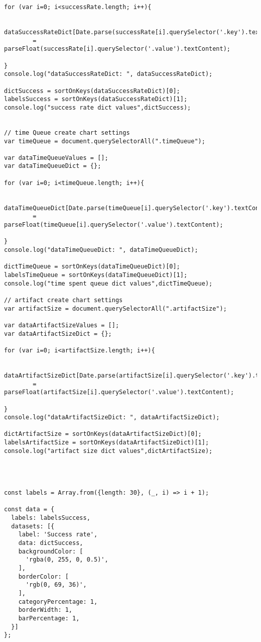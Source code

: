 \begin{lstlisting}
for (var i=0; i<successRate.length; i++){

    dataSuccessRateDict[Date.parse(successRate[i].querySelector('.key').textContent)]
        = parseFloat(successRate[i].querySelector('.value').textContent);

}
console.log("dataSuccessRateDict: ", dataSuccessRateDict);

dictSuccess = sortOnKeys(dataSuccessRateDict)[0];
labelsSuccess = sortOnKeys(dataSuccessRateDict)[1];
console.log("success rate dict values",dictSuccess);


// time Queue create chart settings
var timeQueue = document.querySelectorAll(".timeQueue");

var dataTimeQueueValues = [];
var dataTimeQueueDict = {};

for (var i=0; i<timeQueue.length; i++){

    dataTimeQueueDict[Date.parse(timeQueue[i].querySelector('.key').textContent)]
        = parseFloat(timeQueue[i].querySelector('.value').textContent);

}
console.log("dataTimeQueueDict: ", dataTimeQueueDict);

dictTimeQueue = sortOnKeys(dataTimeQueueDict)[0];
labelsTimeQueue = sortOnKeys(dataTimeQueueDict)[1];
console.log("time spent queue dict values",dictTimeQueue);

// artifact create chart settings
var artifactSize = document.querySelectorAll(".artifactSize");

var dataArtifactSizeValues = [];
var dataArtifactSizeDict = {};

for (var i=0; i<artifactSize.length; i++){

    dataArtifactSizeDict[Date.parse(artifactSize[i].querySelector('.key').textContent)]
        = parseFloat(artifactSize[i].querySelector('.value').textContent);

}
console.log("dataArtifactSizeDict: ", dataArtifactSizeDict);

dictArtifactSize = sortOnKeys(dataArtifactSizeDict)[0];
labelsArtifactSize = sortOnKeys(dataArtifactSizeDict)[1];
console.log("artifact size dict values",dictArtifactSize);




const labels = Array.from({length: 30}, (_, i) => i + 1);

const data = {
  labels: labelsSuccess,
  datasets: [{
    label: 'Success rate',
    data: dictSuccess,
    backgroundColor: [
      'rgba(0, 255, 0, 0.5)',
    ],
    borderColor: [
      'rgb(0, 69, 36)',
    ],
    categoryPercentage: 1,
    borderWidth: 1,
    barPercentage: 1,
  }]
};



\end{lstlisting}
